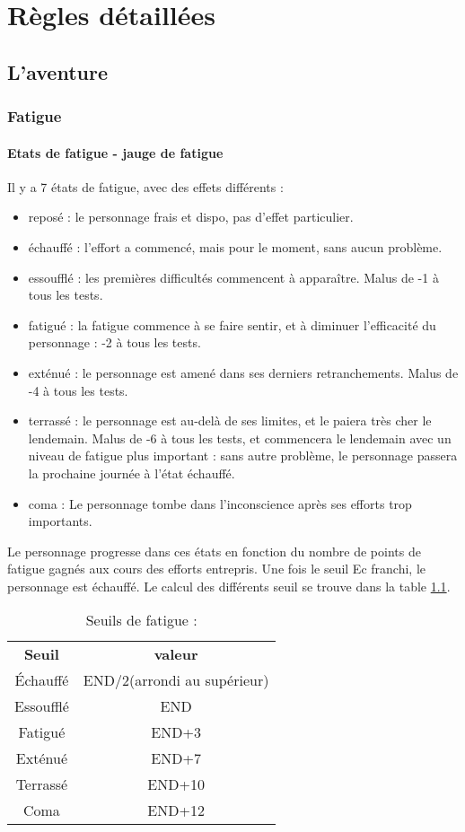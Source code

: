 \documentclass[10pt,a4paper,twocolumn]{book}
\begin{document}
\chapter{Règles détaillées}

\section{L'aventure}
\subsection{Fatigue}
\subsubsection{Etats de fatigue - jauge de fatigue}
Il y  a 7 états de fatigue, avec des effets différents :

\begin{itemize}

\item{reposé} : le personnage frais et dispo, pas d’effet particulier.
\item{échauffé} : l’effort a commencé, mais pour le moment, sans aucun problème.
\item{essoufflé} : les premières difficultés commencent à apparaître. Malus de -1 à tous les tests.
\item{fatigué} : la fatigue commence à se faire sentir, et à diminuer l’efficacité du personnage : -2 à tous les tests.
\item{exténué} : le personnage est amené dans ses derniers retranchements. Malus de -4 à tous les tests.
\item{terrassé} : le personnage est au-delà de ses limites, et le paiera très cher le lendemain. Malus de -6 à tous les tests, et commencera le lendemain avec un niveau de fatigue plus important : sans autre problème, le personnage passera la prochaine journée à l’état échauffé.
\item{coma} : Le personnage tombe dans l’inconscience après ses efforts trop importants.
\end{itemize}
Le personnage progresse dans ces états en fonction du nombre de points de fatigue gagnés aux cours des efforts entrepris.
Une fois le seuil Ec franchi, le personnage est échauffé. 
Le calcul des différents seuil se trouve dans la table \ref{tableSeuilsFatigue}.

\begin{table}
\caption{ Seuils de fatigue :}
\label{tableSeuilsFatigue}
\begin{center}
\begin{tabular}{cc}
\textbf{Seuil} & \textbf{valeur} \\
   Échauffé & END/2(arrondi au supérieur)  \\
   Essoufflé & END  \\
   Fatigué & END+3 \\
   Exténué & END+7 \\
   Terrassé & END+10 \\
   Coma & END+12 \\
\end{tabular}
\end{center}
\end{table}
\end{document}
